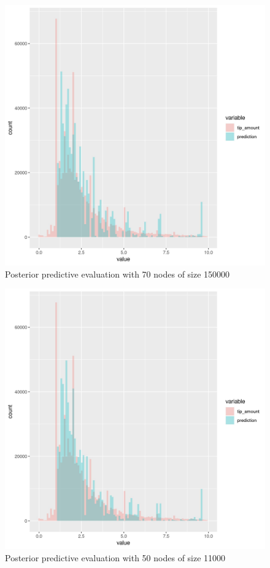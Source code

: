 \documentclass[11pt]{article}
\begin{document}
\begin{figure}[htbp]
\centering
\includegraphics[width=.9\linewidth]{./plots/rfNodesize1e+05Maxnode70PosteriorPredictive.jpg}
\caption{\label{fig:org3f746af}
Posterior predictive evaluation with 70 nodes of size 150000}
\end{figure}

\begin{figure}[htbp]
\centering
\includegraphics[width=.9\linewidth]{./plots/rfNodesize110000Maxnode50PosteriorPredictive.jpg}
\caption{\label{fig:org6f5542f}
Posterior predictive evaluation with 50 nodes of size 11000}
\end{figure}
\end{document}
